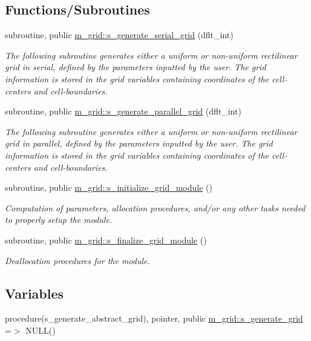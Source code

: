\subsection*{Functions/\+Subroutines}
\begin{DoxyCompactItemize}
\item 
subroutine, public \hyperlink{namespacem__grid_a7c0d1c6fcecd2759774be2b3786a6b50}{m\+\_\+grid\+::s\+\_\+generate\+\_\+serial\+\_\+grid} (dflt\+\_\+int)
\begin{DoxyCompactList}\small\item\em The following subroutine generates either a uniform or non-\/uniform rectilinear grid in serial, defined by the parameters inputted by the user. The grid information is stored in the grid variables containing coordinates of the cell-\/ centers and cell-\/boundaries. \end{DoxyCompactList}\item 
subroutine, public \hyperlink{namespacem__grid_abcc7c446abd0c768e42b2a2f7323a2d7}{m\+\_\+grid\+::s\+\_\+generate\+\_\+parallel\+\_\+grid} (dflt\+\_\+int)
\begin{DoxyCompactList}\small\item\em The following subroutine generates either a uniform or non-\/uniform rectilinear grid in parallel, defined by the parameters inputted by the user. The grid information is stored in the grid variables containing coordinates of the cell-\/ centers and cell-\/boundaries. \end{DoxyCompactList}\item 
subroutine, public \hyperlink{namespacem__grid_a08c7d18352873ceab95c10629c1ce317}{m\+\_\+grid\+::s\+\_\+initialize\+\_\+grid\+\_\+module} ()
\begin{DoxyCompactList}\small\item\em Computation of parameters, allocation procedures, and/or any other tasks needed to properly setup the module. \end{DoxyCompactList}\item 
subroutine, public \hyperlink{namespacem__grid_a128e8c4d55df21039d945edda39205aa}{m\+\_\+grid\+::s\+\_\+finalize\+\_\+grid\+\_\+module} ()
\begin{DoxyCompactList}\small\item\em Deallocation procedures for the module. \end{DoxyCompactList}\end{DoxyCompactItemize}
\subsection*{Variables}
\begin{DoxyCompactItemize}
\item 
procedure(s\+\_\+generate\+\_\+abstract\+\_\+grid), pointer, public \hyperlink{namespacem__grid_a3af3e5a8e440ff542dfd274546fb8150}{m\+\_\+grid\+::s\+\_\+generate\+\_\+grid} =$>$ N\+U\+LL()
\end{DoxyCompactItemize}


